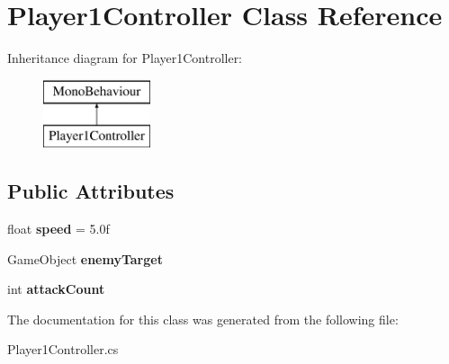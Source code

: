\hypertarget{class_player1_controller}{}\section{Player1\+Controller Class Reference}
\label{class_player1_controller}
Inheritance diagram for Player1\+Controller\+:\begin{figure}[H]
\begin{center}
\leavevmode
\includegraphics[height=2.000000cm]{class_player1_controller}
\end{center}
\end{figure}
\subsection*{Public Attributes}
\begin{DoxyCompactItemize}
\item 
\mbox{\label{class_player1_controller_aa55159a8266e6963c928b73619aae4e9}} 
float {\bfseries speed} = 5.\+0f
\item 
\mbox{\label{class_player1_controller_a8042e7200e7edf15cf8f64fd8015f04e}} 
Game\+Object {\bfseries enemy\+Target}
\item 
\mbox{\label{class_player1_controller_a8e149507b7d18b70c7533d1135ed6fcd}} 
int {\bfseries attack\+Count}
\end{DoxyCompactItemize}


The documentation for this class was generated from the following file\+:\begin{DoxyCompactItemize}
\item 
Player1\+Controller.\+cs\end{DoxyCompactItemize}
